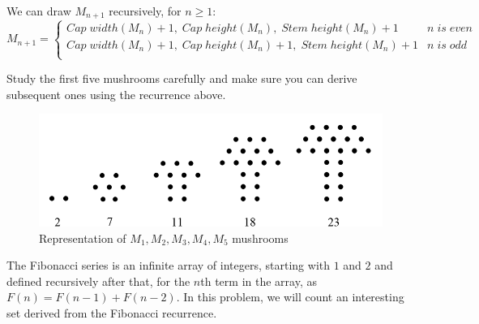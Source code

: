 \documentclass[addpoints]{exam}
\begin{document}
\begin{questions}
We can draw $M_{n+1}$ recursively, for $n \geq 1$:
\[ 
    M_{n+1}=
    \begin{cases} 
      
      Cap\;width(M_n) + 1,\;Cap\;height(M_n),\;Stem\;height(M_n) + 1 & n\;is\;even \\
      
      Cap\;width(M_n) + 1,\;Cap\;height(M_n)+1,\;Stem\;height(M_n) + 1 & n\;is\;odd \\
      
   \end{cases}
\]

Study the first five mushrooms carefully and make sure you can derive subsequent ones using the recurrence above.

\begin{figure}[h]
  \centering
  \includegraphics{mushroom_series.png}
  \caption{Representation of $M_1,M_2,M_3,M_4,M_5$ mushrooms}
  \label{fig:mushroom_anatomy}
\end{figure}


\question
    The Fibonacci series is an infinite array of integers, starting with $1$ and $2$ and defined recursively after that, for the $n$th term in the array, as $F(n) = F(n-1) + F(n-2)$. In this problem, we will count an interesting set derived from the Fibonacci recurrence.
    

\end{questions}
\end{document}
